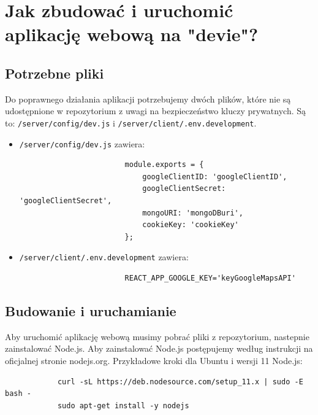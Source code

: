 \documentclass{sprawozdanie-agh}
\begin{document}
   


	\stronatytulowa{}

	

	\section{Jak zbudować i uruchomić aplikację webową na "devie"?}

		\subsection{Potrzebne pliki}

			Do poprawnego działania aplikacji potrzebujemy dwóch plików, które nie są udostępnione w repozytorium z uwagi na bezpieczeństwo kluczy prywatnych.
			Są to: \lstinline{/server/config/dev.js} i \lstinline{/server/client/.env.development}.
			 \begin{itemize}
				 \item \lstinline{/server/config/dev.js} zawiera: 
					\begin{lstlisting}
						module.exports = {
							googleClientID: 'googleClientID',
							googleClientSecret: 'googleClientSecret',
							mongoURI: 'mongoDBuri',
							cookieKey: 'cookieKey'
						};
					\end{lstlisting}
				\item \lstinline{/server/client/.env.development} zawiera:
					\begin{lstlisting}
						REACT_APP_GOOGLE_KEY='keyGoogleMapsAPI'
					\end{lstlisting}
			 \end{itemize}

		\subsection{Budowanie i uruchamianie}

		Aby uruchomić aplikację webową musimy pobrać pliki z repozytorium,
		nastepnie zainstalować Node.js. Aby zainstalować Node.js postępujemy według instrukcji na oficjalnej stronie nodejs.org. Przykładowe kroki dla Ubuntu i wersji 11 Node.js:

		\begin{lstlisting}
			curl -sL https://deb.nodesource.com/setup_11.x | sudo -E bash -
			sudo apt-get install -y nodejs
		\end{lstlisting}
\end{document}
